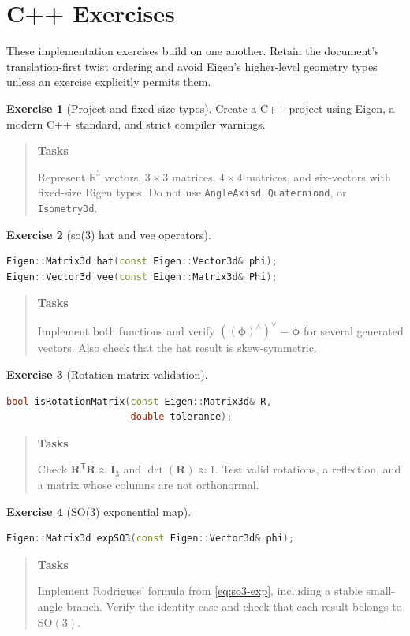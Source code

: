 \documentclass[10pt,a4paper]{article}
\numberwithin{equation}{section}
\newcommand{\Section}[1]{\section{#1}}
\newcommand{\SOthree}{\mathrm{SO}(3)}
\newcommand{\vect}[1]{\boldsymbol{#1}}
\theoremstyle{definition}
\theoremstyle{exercisestyle}
\newtheorem{exercise}{Exercise}[section]
\newenvironment{tasks}
    {\par\begin{quote}\small\textbf{Tasks}\par\smallskip}
    {\end{quote}}
\begin{document}
\clearpage
\Section{C++ Exercises}

These implementation exercises build on one another. Retain the document's
translation-first twist ordering and avoid Eigen's higher-level geometry types
unless an exercise explicitly permits them.

\begin{exercise}[Project and fixed-size types]
Create a C++ project using Eigen, a modern C++ standard, and strict compiler
warnings.
\begin{tasks}
Represent $\mathbb{R}^3$ vectors, $3\times3$ matrices, $4\times4$ matrices,
and six-vectors with fixed-size Eigen types. Do not use
\texttt{AngleAxisd}, \texttt{Quaterniond}, or \texttt{Isometry3d}.
\end{tasks}
\end{exercise}

\begin{exercise}[so(3) hat and vee operators]
\begin{lstlisting}[language=C++]
Eigen::Matrix3d hat(const Eigen::Vector3d& phi);
Eigen::Vector3d vee(const Eigen::Matrix3d& Phi);
\end{lstlisting}
\begin{tasks}
Implement both functions and verify
$((\vect{\phi})^\wedge)^\vee=\vect{\phi}$ for several generated vectors.
Also check that the hat result is skew-symmetric.
\end{tasks}
\end{exercise}

\begin{exercise}[Rotation-matrix validation]
\begin{lstlisting}[language=C++]
bool isRotationMatrix(const Eigen::Matrix3d& R,
                      double tolerance);
\end{lstlisting}
\begin{tasks}
Check $\mathbf{R}^{\mathsf T}\mathbf{R}\approx\mathbf{I}_3$ and
$\det(\mathbf{R})\approx1$. Test valid rotations, a reflection, and a matrix
whose columns are not orthonormal.
\end{tasks}
\end{exercise}

\begin{exercise}[SO(3) exponential map]
\begin{lstlisting}[language=C++]
Eigen::Matrix3d expSO3(const Eigen::Vector3d& phi);
\end{lstlisting}
\begin{tasks}
Implement Rodrigues' formula from \eqref{eq:so3-exp}, including a stable
small-angle branch. Verify the identity case and check that each result belongs
to $\SOthree$.
\end{tasks}
\end{exercise}
\end{document}
